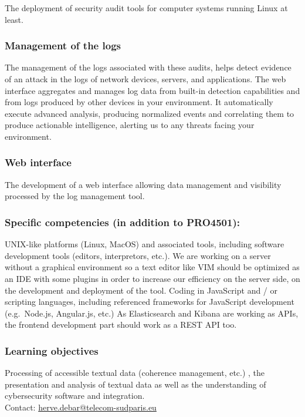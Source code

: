 The deployment of security audit tools for computer systems running Linux at least.

\vspace{0.5cm}
\subsubsection{Management of the logs}
The management of the logs associated with these audits, helps detect evidence of an attack in the logs of network devices, servers, and applications. The web interface aggregates and manages log data from built-in detection capabilities and from logs produced by other devices in your environment. It automatically execute advanced analysis, producing normalized events and correlating them to produce actionable intelligence, alerting us to any threats facing your environment.


\vspace{0.5cm}
\subsubsection{Web interface}
The development of a web interface allowing data management and visibility processed
by the log management tool.


\vspace{0.5cm}
\subsubsection{Specific competencies (in addition to PRO4501):}
UNIX-like platforms (Linux, MacOS) and associated tools, including
software development tools (editors, interpretors, etc.). We are working on a
server without a graphical environment so a text editor like VIM should be
optimized as an IDE with some plugins in order to increase our efficiency on the 
server side, on the development and deployment of the tool. 
Coding in JavaScript and / or scripting languages, including referenced 
frameworks for JavaScript development (e.g.~Node.js, Angular.js, etc.)
As Elasticsearch and Kibana are working as APIs, the frontend development part should work
as a REST API too.


\vspace{0.5cm}
\subsubsection{Learning objectives}
Processing of accessible textual data (coherence management, etc.)
, the presentation and analysis of textual data as well as the understanding of cybersecurity
software and integration. \\
Contact: \url{herve.debar@telecom-sudparis.eu} 


